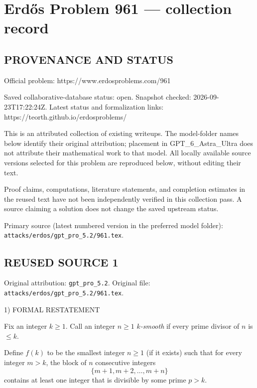 \section*{Erd\H{o}s Problem 961 --- collection record}

\subsection*{PROVENANCE AND STATUS}
Official problem: https://www.erdosproblems.com/961

Saved collaborative-database status: open.
Snapshot checked: 2026-09-23T17:22:24Z.
Latest status and formalization links: https://teorth.github.io/erdosproblems/

This is an attributed collection of existing writeups. The model-folder names below identify their original attribution; placement in GPT\_6\_Astra\_Ultra does not attribute their mathematical work to that model. All locally available source versions selected for this problem are reproduced below, without editing their text.

Proof claims, computations, literature statements, and completion estimates in the reused text have not been independently verified in this collection pass. A source claiming a solution does not change the saved upstream status.

Primary source (latest numbered version in the preferred model folder): \texttt{attacks/erdos/gpt\_pro\_5.2/961.tex}.

\subsection*{REUSED SOURCE 1}
Original attribution: \texttt{gpt\_pro\_5.2}.
Original file: \texttt{attacks/erdos/gpt\_pro\_5.2/961.tex}.


1) FORMAL RESTATEMENT

Fix an integer $k\ge 1$. Call an integer $n\ge 1$ \emph{$k$-smooth} if every prime divisor of $n$ is $\le k$.

Define $f(k)$ to be the smallest integer $n\ge 1$ (if it exists) such that for every integer $m>k$, the block of $n$ consecutive integers
\[
\{m+1,m+2,\dots,m+n\}
\]
contains at least one integer that is divisible by some prime $p>k$.

